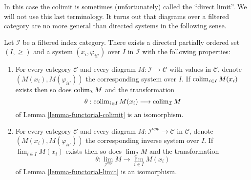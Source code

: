 \noindent
In this case the colimit is sometimes (unfortunately)
called the ``direct limit''. We will not use this last
terminology. It turns out that diagrams over a filtered
category are no more general than directed systems in the
following sense.

\begin{lemma}
\label{lemma-directed-category-system}
Let $\mathcal{I}$ be a filtered index category.
There exists a directed partially ordered set $(I, \geq)$
and a system $(x_i, \varphi_{ii'})$ over $I$ in $\mathcal{I}$
with the following properties:
\begin{enumerate}
\item For every category $\mathcal{C}$ and every diagram
$M : \mathcal{I} \to \mathcal{C}$ with values in $\mathcal{C}$,
denote $(M(x_i), M(\varphi_{ii'}))$
the corresponding system over $I$. If
$\mathop{\rm colim}\nolimits_{i \in I} M(x_i)$ exists then so does
$\mathop{\rm colim}\nolimits_{\mathcal{I}} M$ and the transformation
$$
\theta :
\mathop{\rm colim}\nolimits_{i \in I} M(x_i)
\longrightarrow
\mathop{\rm colim}\nolimits_{\mathcal{I}} M
$$
of Lemma \ref{lemma-functorial-colimit} is an isomorphism.
\item For every category $\mathcal{C}$ and every diagram
$M : \mathcal{I}^{opp} \to \mathcal{C}$ in $\mathcal{C}$, denote
$(M(x_i), M(\varphi_{ii'}))$ the corresponding inverse system
over $I$. If $\lim_{i \in I} M(x_i)$ exists then so does
$\lim_{\mathcal{I}} M$ and the transformation
$$
\theta :
\lim_{\mathcal{I}^{opp}} M
\longrightarrow
\lim_{i \in I} M(x_i)
$$
of Lemma \ref{lemma-functorial-limit} is an isomorphism.
\end{enumerate}
\end{lemma}

